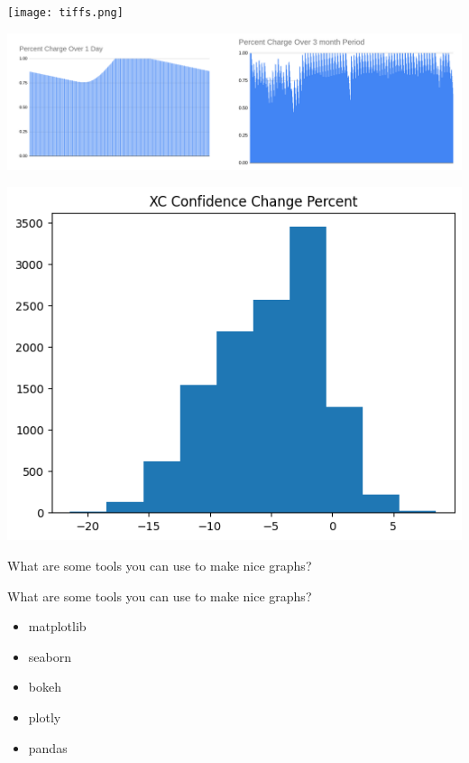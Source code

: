 \documentclass[aspectratio=169]{beamer}
\begin{document}
\begin{frame}
    \centering
    \texttt{[image: tiffs.png]}
\end{frame}
\begin{frame}
    \centering
    \includegraphics[width=\textwidth,height=0.9\textheight,keepaspectratio]{towerBattery.png}
\end{frame}
\begin{frame}
    \centering
    \includegraphics[width=\textwidth,height=0.9\textheight,keepaspectratio]{XC_conf.png}
\end{frame}
\begin{frame}
    What are some tools you can use to make nice graphs?
\end{frame}
\begin{frame}{What are some tools you can use to make nice graphs?}
    \begin{itemize}
        \item matplotlib
        \item seaborn
        \item bokeh
        \item plotly
        \item pandas
    \end{itemize}
\end{frame}
\end{document}
